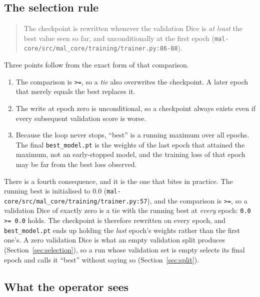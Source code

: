 \documentclass[11pt,a4paper]{article}
\newcommand{\codex}[1]{\texttt{#1}}
\begin{document}
\subsection{The selection rule}

\begin{quote}
The checkpoint is rewritten whenever the validation Dice is \emph{at least}
the best value seen so far, and unconditionally at the first epoch
(\codex{mal-core/\allowbreak{}src/\allowbreak{}mal\_\allowbreak{}core/\allowbreak{}training/\allowbreak{}trainer.py:86-88}).
\end{quote}

Three points follow from the exact form of that comparison.

\begin{enumerate}
\item The comparison is \codex{>=}, so a \emph{tie} also overwrites the
      checkpoint. A later epoch that merely equals the best replaces it.
\item The write at epoch zero is unconditional, so a checkpoint always exists
      even if every subsequent validation score is worse.
\item Because the loop never stops, ``best'' is a running maximum over all
      epochs. The final \codex{best\_\allowbreak{}model.pt} is the weights of the last
      epoch that attained the maximum, not an early-stopped model, and the
      training loss of that epoch may be far from the best loss observed.
\end{enumerate}

There is a fourth consequence, and it is the one that bites in practice. The
running best is initialised to \(0.0\)
(\codex{mal-core/\allowbreak{}src/\allowbreak{}mal\_\allowbreak{}core/\allowbreak{}training/\allowbreak{}trainer.py:57}), and the
comparison is \codex{>=}, so a validation Dice of exactly zero is a tie with
the running best at \emph{every} epoch: \codex{0.0 >= 0.0} holds. The
checkpoint is therefore rewritten on every epoch, and
\codex{best\_\allowbreak{}model.pt} ends up holding the \emph{last} epoch's
weights rather than the first one's. A zero validation Dice is what an empty
validation split produces (Section~\ref{sec:selection}), so a run whose
validation set is empty selects its final epoch and calls it ``best'' without
saying so (Section~\ref{sec:split}).

\subsection{What the operator sees}
\end{document}
